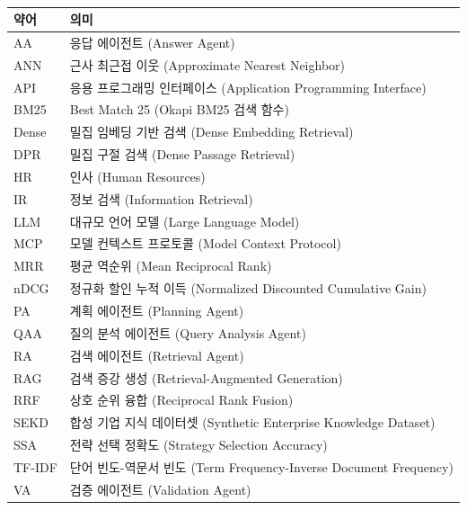 \documentclass[12pt, a4paper, twoside]{report}
\begin{document}
\begin{table}[H]
\caption*{}
\begin{tabular}{ll}
\toprule
\textbf{약어} & \textbf{의미} \\
\midrule
AA      & 응답 에이전트 (Answer Agent) \\
ANN     & 근사 최근접 이웃 (Approximate Nearest Neighbor) \\
API     & 응용 프로그래밍 인터페이스 (Application Programming Interface) \\
BM25    & Best Match 25 (Okapi BM25 검색 함수) \\
Dense   & 밀집 임베딩 기반 검색 (Dense Embedding Retrieval) \\
DPR     & 밀집 구절 검색 (Dense Passage Retrieval) \\
HR      & 인사 (Human Resources) \\
IR      & 정보 검색 (Information Retrieval) \\
LLM     & 대규모 언어 모델 (Large Language Model) \\
MCP     & 모델 컨텍스트 프로토콜 (Model Context Protocol) \\
MRR     & 평균 역순위 (Mean Reciprocal Rank) \\
nDCG    & 정규화 할인 누적 이득 (Normalized Discounted Cumulative Gain) \\
PA      & 계획 에이전트 (Planning Agent) \\
QAA     & 질의 분석 에이전트 (Query Analysis Agent) \\
RA      & 검색 에이전트 (Retrieval Agent) \\
RAG     & 검색 증강 생성 (Retrieval-Augmented Generation) \\
RRF     & 상호 순위 융합 (Reciprocal Rank Fusion) \\
SEKD    & 합성 기업 지식 데이터셋 (Synthetic Enterprise Knowledge Dataset) \\
SSA     & 전략 선택 정확도 (Strategy Selection Accuracy) \\
TF-IDF  & 단어 빈도-역문서 빈도 (Term Frequency-Inverse Document Frequency) \\
VA      & 검증 에이전트 (Validation Agent) \\
\bottomrule
\end{tabular}
\end{table}










\end{document}
